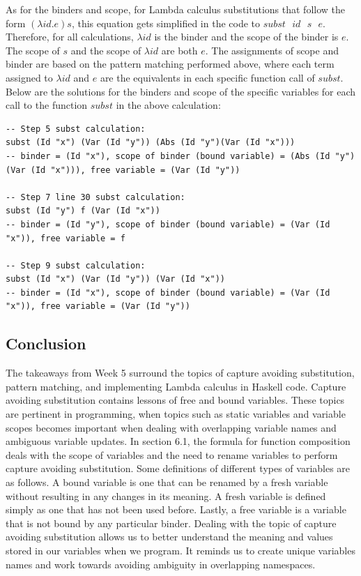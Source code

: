 \documentclass{article}
\theoremstyle{theorem}
\theoremstyle{definition}
\theoremstyle{remark}
\begin{document}
As for the binders and scope, for Lambda calculus substitutions that follow the form $(\lambda id.e)s$, this equation gets simplified in the code to $subst \text{ } id \text{ } s \text{ } e$. Therefore, for all calculations, $\lambda id$ is the binder and the scope of the binder is $e$. The scope of $s$ and the scope of $\lambda id$ are both $e$. The assignments of scope and binder are based on the pattern matching performed above, where each term assigned to $\lambda id$ and $e$ are the equivalents in each specific function call of $subst$. Below are the solutions for the binders and scope of the specific variables for each call to the function $subst$ in the above calculation: 

\begin{lstlisting}
-- Step 5 subst calculation:
subst (Id "x") (Var (Id "y")) (Abs (Id "y")(Var (Id "x"))) 
-- binder = (Id "x"), scope of binder (bound variable) = (Abs (Id "y")(Var (Id "x"))), free variable = (Var (Id "y")) 

-- Step 7 line 30 subst calculation:
subst (Id "y") f (Var (Id "x")) 
-- binder = (Id "y"), scope of binder (bound variable) = (Var (Id "x")), free variable = f

-- Step 9 subst calculation:
subst (Id "x") (Var (Id "y")) (Var (Id "x"))
-- binder = (Id "x"), scope of binder (bound variable) = (Var (Id "x")), free variable = (Var (Id "y"))
\end{lstlisting}

\subsection{Conclusion}

The takeaways from Week 5 surround the topics of capture avoiding substitution, pattern matching, and implementing Lambda calculus in Haskell code. Capture avoiding substitution contains lessons of free and bound variables. These topics are pertinent in programming, when topics such as static variables and variable scopes becomes important when dealing with overlapping variable names and ambiguous variable updates. In section 6.1, the formula for function composition deals with the scope of variables and the need to rename variables to perform capture avoiding substitution. Some definitions of different types of variables are as follows. A bound variable is one that can be renamed by a fresh variable without resulting in any changes in its meaning. A fresh variable is defined simply as one that has not been used before. Lastly, a free variable is a variable that is not bound by any particular binder. Dealing with the topic of capture avoiding substitution allows us to better understand the meaning and values stored in our variables when we program. It reminds us to create unique variables names and work towards avoiding ambiguity in overlapping namespaces. 
\end{document}
